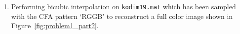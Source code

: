 \documentclass[11pt, a4]{article}
\begin{document}
\begin{enumerate}
\begin{enumerate}
			\item Performing bicubic interpolation on \texttt{kodim19.mat} which has been sampled
			with the CFA pattern ‘RGGB’ to reconstruct a full color image shown in Figure~\ref{fig:problem1_part2}.
			\begin{figure}[H]
				\centering
\end{figure}
\end{enumerate}
\end{enumerate}
\end{document}
